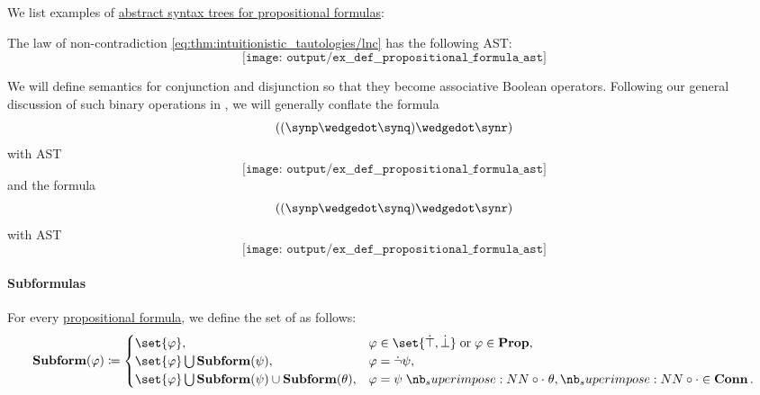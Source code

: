 \begin{example}\label{ex:def:propositional_formula_ast}
  We list examples of \hyperref[def:propositional_formula_ast]{abstract syntax trees for propositional formulas}:
  \begin{thmenum}
     The law of non-contradiction \eqref{eq:thm:intuitionistic_tautologies/lnc} has the following AST:
    \begin{equation*}
      \texttt{[image: output/ex\_\_def\_\_propositional\_formula\_ast]}
    \end{equation*}

     We will define semantics for conjunction and disjunction so that they become associative Boolean operators. Following our general discussion of such binary operations in , we will generally conflate the formula
    \begin{equation*}
      ((\synp \synwedge \synq) \synwedge \synr)
    \end{equation*}
    with AST
    \begin{equation*}
      \texttt{[image: output/ex\_\_def\_\_propositional\_formula\_ast]}
    \end{equation*}
    and the formula
    \begin{equation*}
      ((\synp \synwedge \synq) \synwedge \synr)
    \end{equation*}
    with AST
    \begin{equation*}
      \texttt{[image: output/ex\_\_def\_\_propositional\_formula\_ast]}
    \end{equation*}
  \end{thmenum}
\end{example}

\paragraph{Subformulas}

\begin{definition}\label{def:propositional_subformula}
  For every \hyperref[def:propositional_syntax/formula]{propositional formula}, we define the set of  as follows:
  \begin{equation*}
    \op*{Subform}(\varphi) \coloneqq \begin{cases}
      \set{ \varphi },                                                        &\varphi \in \set{ \syntop, \synbot } \T{or} \varphi \in \op*{Prop}, \\
      \set{ \varphi } \bigcup \op*{Subform}(\psi),                            &\varphi = \synneg \psi, \\
      \set{ \varphi } \bigcup \op*{Subform}(\psi) \cup \op*{Subform}(\theta), &\varphi = \psi \syncirc \theta, {\syncirc} \in \op*{Conn}.
    \end{cases}
  \end{equation*}
\end{definition}

